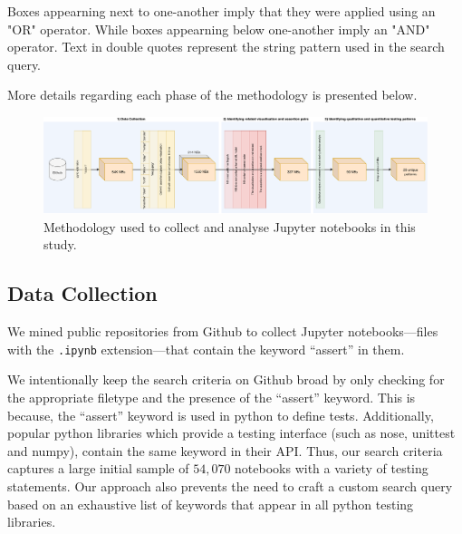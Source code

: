 \documentclass[acmsmall,screen,review,anonymous]{acmart}
\begin{document}
Boxes appearning next to one-another imply that they were applied
using an "OR" operator. While boxes appearning below one-another imply
an "AND" operator. Text in double quotes represent the string pattern
used in the search query.

More details regarding each phase of the methodology is presented below.

\begin{figure}
  \centering
  \includegraphics[width=\textwidth]{method.pdf}
  \caption{Methodology used to collect and analyse Jupyter notebooks
    in this study.}
  \label{fig:method}
\end{figure}

\subsection{Data Collection}\label{sec:data-collect}

We mined public repositories from Github to collect Jupyter
notebooks---files with the \texttt{.ipynb} extension---that contain
the keyword ``assert'' in them.


We intentionally keep the search criteria on Github broad by only
checking for the appropriate filetype and the presence of the
``assert'' keyword. This is because, the ``assert'' keyword is used in
python to define tests. Additionally, popular python libraries which
provide a testing interface (such as nose, unittest and numpy),
contain the same keyword in their API. Thus, our search criteria
captures a large initial sample of $54,070$ notebooks with a variety
of testing statements. Our approach also prevents the need to craft a
custom search query based on an exhaustive list of keywords that
appear in all python testing libraries.
\end{document}

